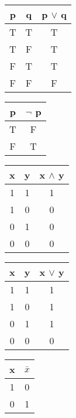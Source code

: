   \begin{tabular}{cc|c}
    p& q& p $\lor$ q\\
    \hline
    T&T&T\\
    T&F&T\\
    F&T&T\\
    F&F&F\\
  \end{tabular}\hspace{1cm}
  \begin{tabular}{c|c}
    p& $\lnot$ p\\
    \hline
    T&F\\
    F&T\\
  \end{tabular}

  \vspace{1cm}
    \begin{tabular}{cc|c}
    x& y& x $\land$ y\\
    \hline
    1&1&1\\
    1&0&0\\
    0&1&0\\
    0&0&0\\
  \end{tabular}\hspace{1cm}
  \begin{tabular}{cc|c}
    x& y& x $\lor$ y\\
    \hline
    1&1&1\\
    1&0&1\\
    0&1&1\\
    0&0&0\\
  \end{tabular}\hspace{1cm}
  \begin{tabular}{c|c}
    x& $\bar{x}$\\
    \hline
    1&0\\
    0&1\\
  \end{tabular}
  
